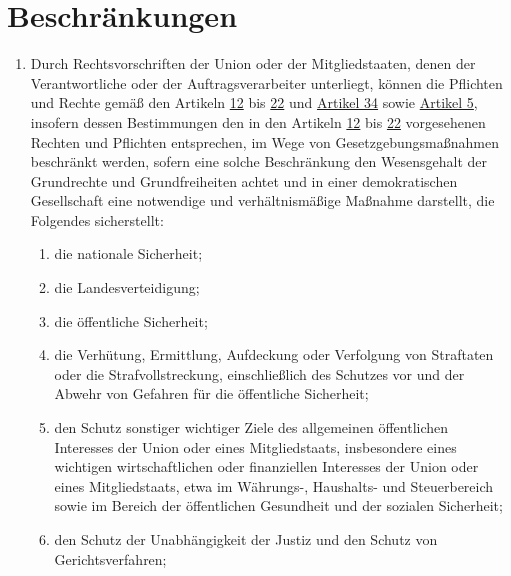 \chapter{Beschränkungen}
\label{ch:23}


\begin{enumerate}

  \item Durch Rechtsvorschriften der Union oder der Mitgliedstaaten, denen der Verantwortliche oder der
   Auftragsverarbeiter unterliegt, können die Pflichten und Rechte gemäß den Artikeln \hyperref[ch:12]
   {12} bis \hyperref[ch:22]{22} und \hyperref[ch:34]{Artikel 34} sowie \hyperref[ch:5]{Artikel 5}, insofern dessen
   Bestimmungen den in den Artikeln \hyperref[ch:12]{12} bis \hyperref[ch:22]{22} vorgesehenen Rechten und Pflichten
   entsprechen, im Wege von Gesetzgebungsmaßnahmen beschränkt werden, sofern eine solche Beschränkung den Wesensgehalt
   der Grundrechte und Grundfreiheiten achtet und in einer demokratischen Gesellschaft eine notwendige und
   verhältnismäßige Maßnahme darstellt, die Folgendes sicherstellt:
  \label{itm:23-1}

  \begin{enumerate}
  
    \item die nationale Sicherheit;
    \label{itm:23-1a}

    \item die Landesverteidigung;
    \label{itm:23-1b}

    \item die öffentliche Sicherheit;
    \label{itm:23-1c}

    \item die Verhütung, Ermittlung, Aufdeckung oder Verfolgung von Straftaten oder die Strafvollstreckung,
     einschließlich des Schutzes vor und der Abwehr von Gefahren für die öffentliche Sicherheit;
    \label{itm:23-1d}

    \item den Schutz sonstiger wichtiger Ziele des allgemeinen öffentlichen Interesses der Union oder eines
     Mitgliedstaats, insbesondere eines wichtigen wirtschaftlichen oder finanziellen Interesses der Union oder eines
     Mitgliedstaats, etwa im Währungs-, Haushalts- und Steuerbereich sowie im Bereich der öffentlichen Gesundheit und
     der sozialen Sicherheit;
    \label{itm:23-1e}

    \item den Schutz der Unabhängigkeit der Justiz und den Schutz von Gerichtsverfahren;
    \label{itm:23-1f}


\end{enumerate}
\end{enumerate}
